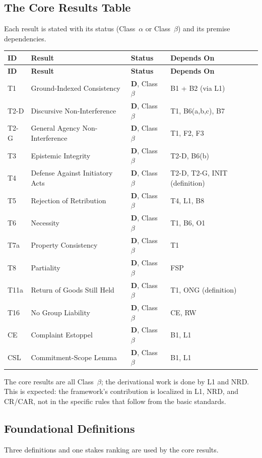 \documentclass[11pt]{article}
\newcommand{\statusD}{\textcolor{stD}{\textbf{D}}}
\newcommand{\ca}{\texorpdfstring{Class~$\alpha$}{Class alpha}}
\newcommand{\cb}{\texorpdfstring{Class~$\beta$}{Class beta}}
\begin{document}
\subsection{The Core Results Table}
Each result is stated with its status (\ca{} or \cb{}) and its premise dependencies.
\begin{longtable}{@{}L{1.2cm} L{5.6cm} L{1.9cm} L{6.4cm}@{}}
\toprule
\textbf{ID} & \textbf{Result} & \textbf{Status} & \textbf{Depends On} \\
\midrule
\endfirsthead
\toprule
\textbf{ID} & \textbf{Result} & \textbf{Status} & \textbf{Depends On} \\
\midrule
\endhead
\bottomrule
\endfoot
T1 & Ground-Indexed Consistency & \statusD{}, \cb{} & B1 + B2 (via L1) \\
T2-D & Discursive Non-Interference & \statusD{}, \cb{} & T1, B6(a,b,c), B7 \\
T2-G & General Agency Non-Interference & \statusD{}, \cb{} & T1, F2, F3 \\
T3 & Epistemic Integrity & \statusD{}, \cb{} & T2-D, B6(b) \\
T4 & Defense Against Initiatory Acts & \statusD{}, \cb{} & T2-D, T2-G, INIT (definition) \\
T5 & Rejection of Retribution & \statusD{}, \cb{} & T4, L1, B8 \\
T6 & Necessity & \statusD{}, \cb{} & T1, B6, O1 \\
T7a & Property Consistency & \statusD{}, \cb{} & T1 \\
T8 & Partiality & \statusD{}, \cb{} & FSP \\
T11a & Return of Goods Still Held & \statusD{}, \cb{} & T1, ONG (definition) \\
T16 & No Group Liability & \statusD{}, \cb{} & CE, RW \\
CE & Complaint Estoppel & \statusD{}, \cb{} & B1, L1 \\
CSL & Commitment-Scope Lemma & \statusD{}, \cb{} & B1, L1 \\
\end{longtable}
The core results are all \cb{}; the derivational work is done by L1 and NRD. This is expected: the framework's contribution is localized in L1, NRD, and CR/CAR, not in the specific rules that follow from the basic standards.

\subsection{Foundational Definitions}
Three definitions and one stakes ranking are used by the core results.
\end{document}
